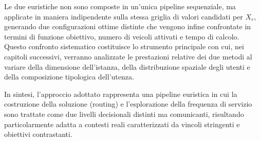 Le due euristiche non sono composte in un'unica pipeline sequenziale, ma applicate in maniera indipendente sulla stessa griglia di valori candidati per $X_r$, generando due configurazioni ottime distinte che vengono infine confrontate in termini di funzione obiettivo, numero di veicoli attivati e tempo di calcolo. Questo confronto sistematico costituisce lo strumento principale con cui, nei capitoli successivi, verranno analizzate le prestazioni relative dei due metodi al variare della dimensione dell'istanza, della distribuzione spaziale degli utenti e della composizione tipologica dell'utenza.

In sintesi, l'approccio adottato rappresenta una pipeline euristica in cui la costruzione della soluzione (routing) e l'esplorazione della frequenza di servizio sono trattate come due livelli decisionali distinti ma comunicanti, risultando particolarmente adatta a contesti reali caratterizzati da vincoli stringenti e obiettivi contrastanti.